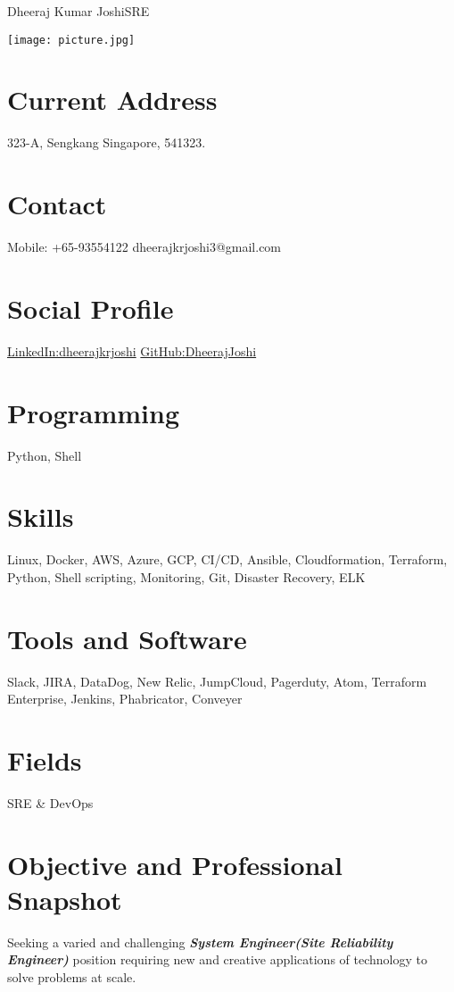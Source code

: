 \documentclass[]{friggeri-cv} %
\begin{document}
\header\Large{Dheeraj Kumar Joshi}{SRE}

\begin{aside} %
\texttt{[image: picture.jpg]}
\section{Current Address}
323-A, Sengkang
Singapore, 541323.
~
\section{Contact}
Mobile: +65-93554122
dheerajkrjoshi3@gmail.com
~
\section{Social Profile}
\href{https://www.linkedin.com/in/dheerajkrjoshi/}{LinkedIn:dheerajkrjoshi}
\href{https://github.com/DheerajJoshi}{GitHub:DheerajJoshi}
\textbf{}
\section{Programming}
Python, Shell
\textbf{}
\section{Skills}
Linux, Docker, AWS, Azure, GCP,
CI/CD, Ansible,
Cloudformation, Terraform,
Python, Shell scripting, Monitoring, Git, Disaster Recovery, ELK
\textbf{}
\section{Tools and Software}
Slack, JIRA, DataDog, New Relic, JumpCloud, Pagerduty, Atom, Terraform Enterprise, Jenkins, Phabricator, Conveyer 
\textbf{}
\section{Fields}
SRE \& DevOps
\textbf{}
\end{aside}

\section{Objective and Professional Snapshot}
{Seeking a varied and challenging \textbf{\textit{System Engineer(Site Reliability Engineer)}} position requiring new and creative applications of technology to solve problems at scale.}
\end{document}
